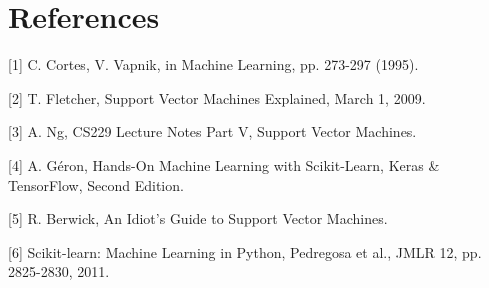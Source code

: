 \documentclass[10pt, a4paper,reqno]{amsart}
\begin{document}
\section{References}

[1] C. Cortes, V. Vapnik, in Machine Learning, pp. 273-297 (1995).

[2] T. Fletcher, Support Vector Machines Explained, March 1, 2009.

[3] A. Ng, CS229 Lecture Notes Part V, Support Vector Machines.

[4] A. G\'{e}ron, Hands-On Machine Learning with Scikit-Learn, Keras \& TensorFlow, Second Edition.

[5] R. Berwick, An Idiot's Guide to Support Vector Machines.

[6] Scikit-learn: Machine Learning in Python, Pedregosa et al., JMLR 12, pp. 2825-2830, 2011.
\end{document}
